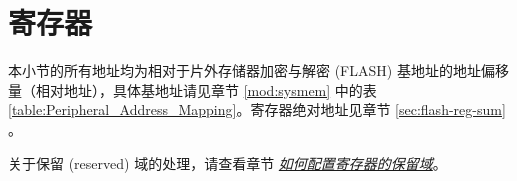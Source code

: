\documentclass[main\_\_CN.tex]{subfiles}
\begin{document}
\section{寄存器}

本小节的所有地址均为相对于片外存储器加密与解密 (FLASH) 基地址的地址偏移量（相对地址），具体基地址请见章节 \ref{mod:sysmem} \textit{} 中的表 \ref{table:Peripheral_Address_Mapping}。寄存器绝对地址见章节 \ref{sec:flash-reg-sum} \textit{}。

关于保留 (reserved) 域的处理，请查看章节 \hyperref[programming-reserved-field]{\textit{如何配置寄存器的保留域}}。


\end{document}
